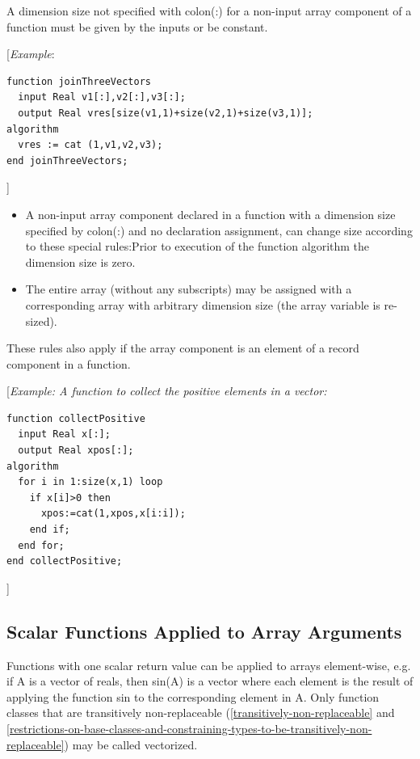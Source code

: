 \documentclass[10pt,a4paper]{report}
\def\doublelabel#1{\label{#1}}
\begin{document}
A dimension size not specified with colon(:) for a non-input array
component of a function must be given by the inputs or be constant.

{[}\emph{Example}:

\begin{lstlisting}[language=modelica]
function joinThreeVectors
  input Real v1[:],v2[:],v3[:];
  output Real vres[size(v1,1)+size(v2,1)+size(v3,1)];
algorithm
  vres := cat (1,v1,v2,v3);
end joinThreeVectors;
\end{lstlisting}
{]}

\begin{itemize}
\item
  A non-input array component declared in a function with a dimension
  size specified by colon(:) and no declaration assignment, can change
  size according to these special rules:Prior to execution of the
  function algorithm the dimension size is zero.
\item
  The entire array (without any subscripts) may be assigned with a
  corresponding array with arbitrary dimension size (the array variable
  is re-sized).
\end{itemize}

These rules also apply if the array component is an element of a record
component in a function.

{[}\emph{Example: A function to collect the positive elements in a
vector:}

\begin{lstlisting}[language=modelica]
function collectPositive
  input Real x[:];
  output Real xpos[:];
algorithm
  for i in 1:size(x,1) loop
    if x[i]>0 then
      xpos:=cat(1,xpos,x[i:i]);
    end if;
  end for;
end collectPositive;
\end{lstlisting}
{]}

\subsection{Scalar Functions Applied to Array Arguments}\doublelabel{scalar-functions-applied-to-array-arguments}

Functions with one scalar return value can be applied to arrays
element-wise, e.g. if A is a vector of reals, then sin(A) is a vector
where each element is the result of applying the function sin to the
corresponding element in A. Only function classes that are transitively
non-replaceable (\ref{transitively-non-replaceable} and \ref{restrictions-on-base-classes-and-constraining-types-to-be-transitively-non-replaceable}) may be called vectorized.
\end{document}
